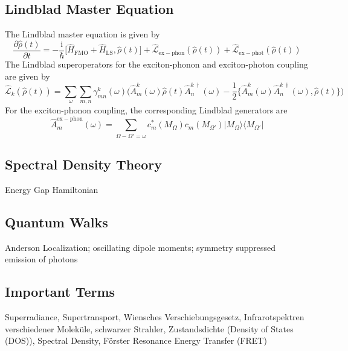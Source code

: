 \documentclass[9pt]{report}
\begin{document}
\subsection{Lindblad Master Equation}
The Lindblad master equation is given by
\begin{equation}
\frac{\partial\hat{\rho}(t)}{\partial t} = -\frac{\mathrm{i}}{\hbar}\big[\hat{H}_{\mathrm{FMO}}+\hat{H}_{\mathrm{LS}},\hat{\rho}(t)\big]+\hat{\mathcal{L}}_{\mathrm{ex-phon}}(\hat{\rho}(t))+\hat{\mathcal{L}}_{\mathrm{ex-phot}}(\hat{\rho}(t))
\end{equation}
The Lindblad superoperators for the exciton-phonon and exciton-photon coupling are given by
\begin{equation}
\hat{\mathcal{L}}_{k}(\hat{\rho}(t))=\sum_{\omega}\sum_{m,n}\gamma_{mn}^{k}(\omega)\bigg(\hat{A}_{m}^{k}(\omega)\hat{\rho}(t)\hat{A}_{n}^{k\,\dagger}(\omega)-\frac{1}{2}\Big\{\hat{A}_{m}^{k}(\omega)\hat{A}_{n}^{k\,\dagger}(\omega),\hat{\rho}(t)\Big\}\bigg)
\end{equation}
For the exciton-phonon coupling, the corresponding Lindblad generators are
\begin{equation}
\hat{A}_{m}^{\mathrm{ex-phon}}(\omega)=\sum_{\Omega-\Omega'=\omega}c_{m}^{*}(M_{\Omega})c_{m}(M_{\Omega'})\big|M_{\Omega}\big\rangle\big\langle M_{\Omega'}\big|
\end{equation} 




\subsection{Spectral Density Theory}
Energy Gap Hamiltonian





\subsection{Quantum Walks}
Anderson Localization; oscillating dipole moments; symmetry suppressed emission of photons


\subsection{Important Terms}
Superradiance, Supertransport, Wiensches Verschiebungsgesetz, Infrarotspektren verschiedener Moleküle, schwarzer Strahler, Zustandsdichte (Density of States (DOS)), Spectral Density, Förster Resonance Energy Transfer (FRET)
\end{document}
